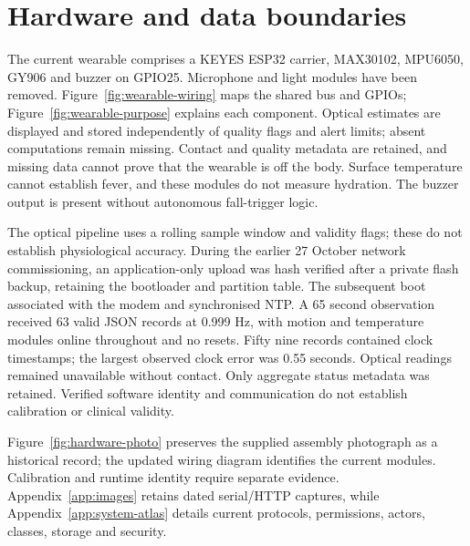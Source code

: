 \section{Hardware and data boundaries}
\label{sec:hardware}
\begin{reportprose}
The current wearable comprises a KEYES ESP32 carrier, MAX30102, MPU6050, GY906 and buzzer on GPIO25. Microphone and light modules have been removed. Figure~\ref{fig:wearable-wiring} maps the shared bus and GPIOs; Figure~\ref{fig:wearable-purpose} explains each component. Optical estimates are displayed and stored independently of quality flags and alert limits; absent computations remain missing. Contact and quality metadata are retained, and missing data cannot prove that the wearable is off the body. Surface temperature cannot establish fever, and these modules do not measure hydration. The buzzer output is present without autonomous fall-trigger logic.

The optical pipeline uses a rolling sample window and validity flags; these do not establish physiological accuracy. During the earlier 27 October network commissioning, an application-only upload was hash verified after a private flash backup, retaining the bootloader and partition table. The subsequent boot associated with the modem and synchronised NTP. A 65 second observation received 63 valid JSON records at 0.999 Hz, with motion and temperature modules online throughout and no resets. Fifty nine records contained clock timestamps; the largest observed clock error was 0.55 seconds. Optical readings remained unavailable without contact. Only aggregate status metadata was retained. Verified software identity and communication do not establish calibration or clinical validity.\cite{firmwarenetwork}

Figure~\ref{fig:hardware-photo} preserves the supplied assembly photograph as a historical record; the updated wiring diagram identifies the current modules. Calibration and runtime identity require separate evidence. Appendix~\ref{app:images} retains dated serial/HTTP captures, while Appendix~\ref{app:system-atlas} details current protocols, permissions, actors, classes, storage and security.
\end{reportprose}
\HardwarePhotoFigure
\FloatBarrier

